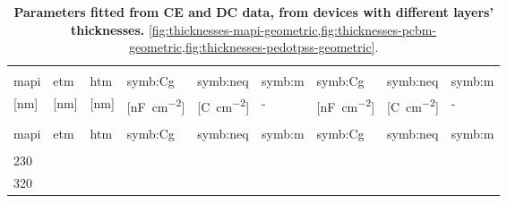\begin{xltabular}[c]{1.1\linewidth}{@{}>{\hsize}Y|>{\hsize}Y|>{\hsize}Y | Y >{\hsize}Y >{\hsize}Y | Y  >{\hsize}Y >{\hsize}Y @{}}
	\caption[Parameters fitted from CE and DC data, from devices with different layers' thicknesses.]{\textbf{Parameters fitted from CE and DC data, from devices with different layers' thicknesses.}
		 \cref{fig:thicknesses-mapi-geometric,fig:thicknesses-pcbm-geometric,fig:thicknesses-pedotpss-geometric}.
	}\label{table:thicknesses_photophysics}\\[\belowcaptionskip]
	 &  & 
	\rule[-1ex]{0pt}{3ex} \\
	\gls{mapi} &  \gls{etm} & \gls{htm} & \gls{symb:Cg} & \gls{symb:neq} &  \gls{symb:m} & \gls{symb:Cg} & \gls{symb:neq} &  \gls{symb:m} \\ 
	\rule[-1ex]{0pt}{2.5ex}  \footnotesize[\si{\nm}] &  \footnotesize[\si{\nm}] &  \footnotesize[\si{\nm}] & \footnotesize[\si{\nano\F\per\square\cm}] &  \footnotesize[\si{\coulomb\per\square\cm}] & - &  \footnotesize[\si{\nano\F\per\square\cm}] &  \footnotesize[\si{\coulomb\per\square\cm}] & - \\[1mm]
	\hline
	\endfirsthead
	\\
	\hline
	\gls{mapi} & \gls{etm} & \gls{htm} & \gls{symb:Cg} & \gls{symb:neq} &  \gls{symb:m} & \gls{symb:Cg} & \gls{symb:neq} &  \gls{symb:m} \\ 
	\hline
	\endhead
	\hline
	\\
	\endfoot
	\hline
	\endlastfoot
	\rule[-1ex]{0pt}{4ex}
	230 	& 	&  	& 	& 	& 	& 	& 	&  \\
	 
\rule[-1ex]{0pt}{4ex}
	320	&  						& 						& 	& 	& 	& 	& 	&  \\

\end{xltabular}
